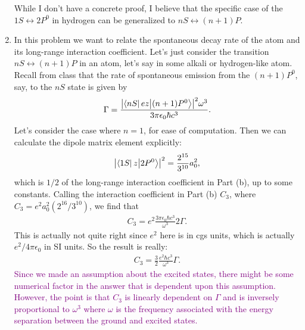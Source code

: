 \documentclass{article}
\theoremstyle{definition}
\newcommand{\f}[2]{\frac{#1}{#2}}
\begin{document}
\begin{enumerate}[label=(\alph*)]
While I don't have a concrete proof, I believe that the specific case of the $1S \leftrightarrow 2P^0$ in hydrogen can be generalized to $nS \leftrightarrow (n+1)P$. 




\item In this problem we want to relate the spontaneous decay rate of the atom and its long-range interaction coefficient. Let's just consider the transition $nS \leftrightarrow (n+1)P$ in an atom, let's say in some alkali or hydrogen-like atom. Recall from class that the rate of spontaneous emission from the $(n+1)P^0$, say, to the $nS$ state is given by 
\begin{align*}
\Gamma = \f{\abs{\bra{nS} e z {\ket{(n+1)P^0}}}^2 \omega^3}{ 3\pi \epsilon_0 \hbar c^3}. 
\end{align*}
Let's consider the case where $n=1$, for ease of computation. Then we can calculate the dipole matrix element explicitly:
\begin{align*}
\abs{\bra{1S} z {\ket{2P^0}}}^2 = \f{2^{15}}{3^{10}} a_0^2,
\end{align*}
which is $1/2$ of the long-range interaction coefficient in Part (b), up to some constants. Calling the interaction coefficient in Part (b) $C_3$, where $C_3 = e^2 a_0^2 (2^{16} / 3^{10})$, we find that
\begin{align*}
C_3 = e^2 \f{3\pi \epsilon_0 \hbar c^3 }{\omega^3} 2\Gamma.
\end{align*}
This is actually not quite right since $e^2$ here is in cgs units, which is actually $e^2/4\pi\epsilon_0$ in SI units. So the result is really:
\begin{align*}
C_3 = \f{3}{2}  \f{e^2 \hbar c^3}{\omega^3} \Gamma.
\end{align*}
\textcolor{purple}{Since we made an assumption about the excited states, there might be some numerical factor in the answer that is dependent upon this assumption. However, the point is that $C_3$ is linearly dependent on $\Gamma$ and is inversely proportional to $\omega^3$ where $\omega$ is the frequency associated with the energy separation between the ground and excited states. }


\end{enumerate}
\end{document}
